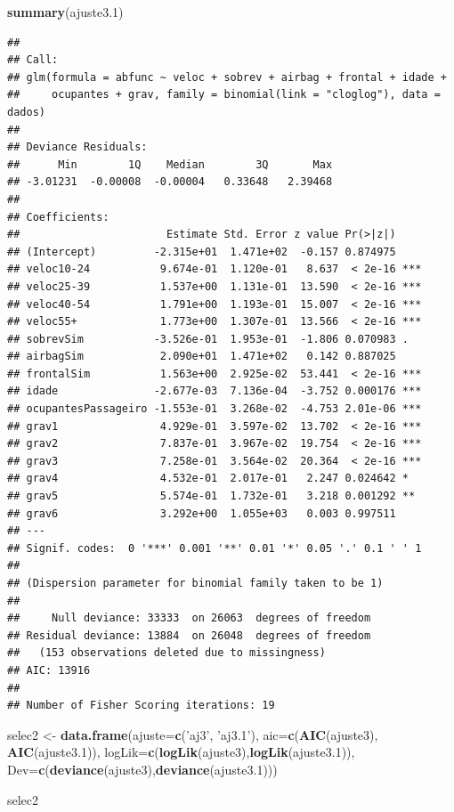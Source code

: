 \documentclass[]{article}
\newenvironment{Shaded}{\begin{snugshade}}{\end{snugshade}}
\newcommand{\KeywordTok}[1]{\textcolor[rgb]{0.13,0.29,0.53}{\textbf{#1}}}
\newcommand{\DataTypeTok}[1]{\textcolor[rgb]{0.13,0.29,0.53}{#1}}
\newcommand{\FloatTok}[1]{\textcolor[rgb]{0.00,0.00,0.81}{#1}}
\newcommand{\StringTok}[1]{\textcolor[rgb]{0.31,0.60,0.02}{#1}}
\newcommand{\NormalTok}[1]{#1}
\begin{document}
\begin{Shaded}
\begin{Highlighting}[]
\KeywordTok{summary}\NormalTok{(ajuste3}\FloatTok{.1}\NormalTok{)}
\end{Highlighting}
\end{Shaded}

\begin{verbatim}
## 
## Call:
## glm(formula = abfunc ~ veloc + sobrev + airbag + frontal + idade + 
##     ocupantes + grav, family = binomial(link = "cloglog"), data = dados)
## 
## Deviance Residuals: 
##      Min        1Q    Median        3Q       Max  
## -3.01231  -0.00008  -0.00004   0.33648   2.39468  
## 
## Coefficients:
##                       Estimate Std. Error z value Pr(>|z|)    
## (Intercept)         -2.315e+01  1.471e+02  -0.157 0.874975    
## veloc10-24           9.674e-01  1.120e-01   8.637  < 2e-16 ***
## veloc25-39           1.537e+00  1.131e-01  13.590  < 2e-16 ***
## veloc40-54           1.791e+00  1.193e-01  15.007  < 2e-16 ***
## veloc55+             1.773e+00  1.307e-01  13.566  < 2e-16 ***
## sobrevSim           -3.526e-01  1.953e-01  -1.806 0.070983 .  
## airbagSim            2.090e+01  1.471e+02   0.142 0.887025    
## frontalSim           1.563e+00  2.925e-02  53.441  < 2e-16 ***
## idade               -2.677e-03  7.136e-04  -3.752 0.000176 ***
## ocupantesPassageiro -1.553e-01  3.268e-02  -4.753 2.01e-06 ***
## grav1                4.929e-01  3.597e-02  13.702  < 2e-16 ***
## grav2                7.837e-01  3.967e-02  19.754  < 2e-16 ***
## grav3                7.258e-01  3.564e-02  20.364  < 2e-16 ***
## grav4                4.532e-01  2.017e-01   2.247 0.024642 *  
## grav5                5.574e-01  1.732e-01   3.218 0.001292 ** 
## grav6                3.292e+00  1.055e+03   0.003 0.997511    
## ---
## Signif. codes:  0 '***' 0.001 '**' 0.01 '*' 0.05 '.' 0.1 ' ' 1
## 
## (Dispersion parameter for binomial family taken to be 1)
## 
##     Null deviance: 33333  on 26063  degrees of freedom
## Residual deviance: 13884  on 26048  degrees of freedom
##   (153 observations deleted due to missingness)
## AIC: 13916
## 
## Number of Fisher Scoring iterations: 19
\end{verbatim}

\begin{Shaded}
\begin{Highlighting}[]
\NormalTok{selec2 <-}\StringTok{ }\KeywordTok{data.frame}\NormalTok{(}\DataTypeTok{ajuste=}\KeywordTok{c}\NormalTok{(}\StringTok{'aj3'}\NormalTok{, }\StringTok{'aj3.1'}\NormalTok{),}
                    \DataTypeTok{aic=}\KeywordTok{c}\NormalTok{(}\KeywordTok{AIC}\NormalTok{(ajuste3), }\KeywordTok{AIC}\NormalTok{(ajuste3}\FloatTok{.1}\NormalTok{)),}
                    \DataTypeTok{logLik=}\KeywordTok{c}\NormalTok{(}\KeywordTok{logLik}\NormalTok{(ajuste3),}\KeywordTok{logLik}\NormalTok{(ajuste3}\FloatTok{.1}\NormalTok{)),}
                    \DataTypeTok{Dev=}\KeywordTok{c}\NormalTok{(}\KeywordTok{deviance}\NormalTok{(ajuste3),}\KeywordTok{deviance}\NormalTok{(ajuste3}\FloatTok{.1}\NormalTok{)))}

\NormalTok{selec2}
\end{Highlighting}
\end{Shaded}
\end{document}
